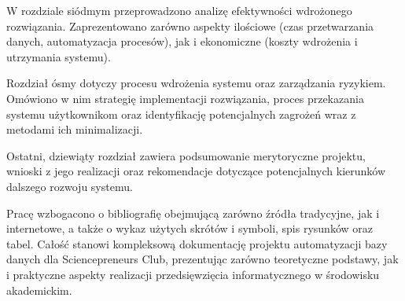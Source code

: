 W rozdziale siódmym przeprowadzono analizę efektywności wdrożonego rozwiązania. Zaprezentowano zarówno aspekty ilościowe (czas przetwarzania danych, automatyzacja procesów), jak i ekonomiczne (koszty wdrożenia i utrzymania systemu).

Rozdział ósmy dotyczy procesu wdrożenia systemu oraz zarządzania ryzykiem. Omówiono w nim strategię implementacji rozwiązania, proces przekazania systemu użytkownikom oraz identyfikację potencjalnych zagrożeń wraz z metodami ich minimalizacji.

Ostatni, dziewiąty rozdział zawiera podsumowanie merytoryczne projektu, wnioski z jego realizacji oraz rekomendacje dotyczące potencjalnych kierunków dalszego rozwoju systemu.

Pracę wzbogacono o bibliografię obejmującą zarówno źródła tradycyjne, jak i internetowe, a także o wykaz użytych skrótów i symboli, spis rysunków oraz tabel. Całość stanowi kompleksową dokumentację projektu automatyzacji bazy danych dla Sciencepreneurs Club, prezentując zarówno teoretyczne podstawy, jak i praktyczne aspekty realizacji przedsięwzięcia informatycznego w środowisku akademickim.